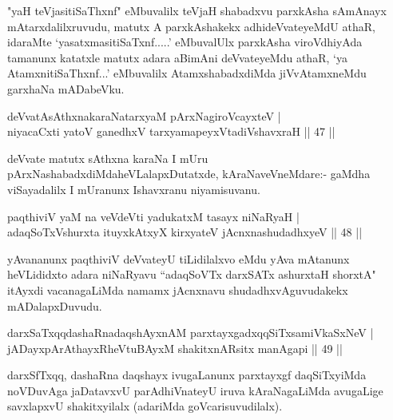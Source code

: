 \begin{artha}
"yaH teVjasitiSaThxnf" eMbuvalilx teVjaH shabadxvu parxkAsha sAmAnayx mAtarxdalilxruvudu, matutx A parxkAshakekx adhideVvateyeMdU athaR, idaraMte `yasatxmasitiSaTxnf.....' eMbuvalUlx parxkAsha viroVdhiyAda tamanunx katatxle matutx adara aBimAni deVvateyeMdu athaR, `ya AtamxnitiSaThxnf...' eMbuvalilx AtamxshabadxdiMda jiVvAtamxneMdu garxhaNa mADabeVku.
\end{artha}%


\begin{shl}
deVvatAsAthxnakaraNatarxyaM pArxNagiroVcayxteV |\\
niyacaCxti yatoV ganedhxV tarxyamapeyxVtadiVshavxraH \hfill || 47 ||
\end{shl}

\begin{artha}
deVvate matutx sAthxna karaNa I mUru pArxNashabadxdiMda\break heVLalapxDutatxde, kAraNaveVneMdare:- gaMdha viSayadalilx I mUranunx Ishavxranu niyamisuvanu.
\end{artha}


\begin{shl}
paqthiviV yaM na veVdeVti yadukatxM tasayx niNaRyaH |\\
adaqSoTxV\s shurxta ituyxkAtxyX kirxyateV jAcnxnashudadhxyeV \hfill || 48 ||
\end{shl}

\begin{artha}
yAvananunx paqthiviV deVvateyU tiLidilalxvo eMdu yAva mAtanunx heVLididxto adara niNaRyavu ``adaqSoVTx darxSATx ashurxtaH shorxtA" itAyxdi vacanagaLiMda namamx jAcnxnavu shudadhxvAguvudakekx mADalapxDuvudu.
\end{artha}


\begin{shl}
darxSaTxqqdashaRnadaqshAyxnAM parxtayxgadxqqSiTxsamiVkaSxNeV |\\
jADayxpArAthayxRheVtuBAyxM shakitxnARsitx manAgapi \hfill || 49 ||
\end{shl}

\begin{artha}
darxSfTxqq, dashaRna daqshayx ivugaLanunx parxtayxgf daqSiTxyiMda noVDuvAga jaDatavxvU parAdhiVnateyU iruva kAraNagaLiMda avugaLige savxlapxvU shakitxyilalx (adariMda goVcarisuvudilalx).
\end{artha}

